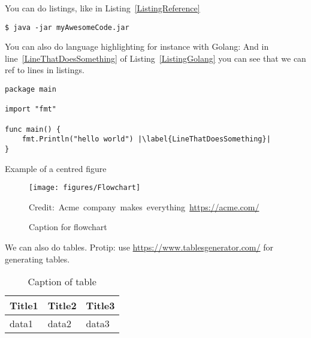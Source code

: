 You can do listings, like in Listing~\ref{ListingReference}
\begin{lstlisting}[caption={[Short caption]Look at this cool listing. Find the rest in Appendix~\ref{Listing}},label=ListingReference]
$ java -jar myAwesomeCode.jar
\end{lstlisting}

You can also do language highlighting for instance with Golang:
And in line~\ref{LineThatDoesSomething} of Listing~\ref{ListingGolang} you can see that we can ref to lines in listings.

\begin{lstlisting}[caption={Hello world in Golang},label=ListingGolang,escapechar=|]
package main

import "fmt"

func main() {
    fmt.Println("hello world") |\label{LineThatDoesSomething}|
}

\end{lstlisting}



Example of a centred figure
\begin{figure}[H]
    \centering
    \texttt{[image: figures/Flowchart]}
    \caption{Caption for flowchart}
  	\medskip 
	\hspace*{15pt}\hbox{\scriptsize Credit: Acme company makes everything \url{https://acme.com/}}
    \label{FlowchartFigure}
\end{figure}



We can also do tables. Protip: use \url{https://www.tablesgenerator.com/} for generating tables.
\begin{table}[H]
\centering
\caption{Caption of table}
\label{TableLabel}
\begin{tabular}{|l|l|l|}
\hline
Title1 & Title2 & Title3 \\ \hline
data1  & data2  & data3  \\ \hline
\end{tabular}
\end{table}

